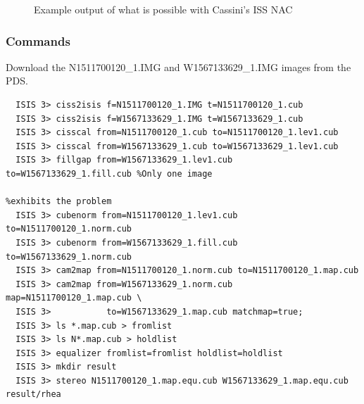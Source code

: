 \begin{figure}[p]
  \hfil
\caption{Example output of what is possible with Cassini's ISS NAC}
\label{fig:cassini-exampe}
\end{figure}

\subsubsection*{Commands}

Download the N1511700120\_1.IMG and W1567133629\_1.IMG images from the \ac{PDS}.
\begin{verbatim}
  ISIS 3> ciss2isis f=N1511700120_1.IMG t=N1511700120_1.cub
  ISIS 3> ciss2isis f=W1567133629_1.IMG t=W1567133629_1.cub
  ISIS 3> cisscal from=N1511700120_1.cub to=N1511700120_1.lev1.cub
  ISIS 3> cisscal from=W1567133629_1.cub to=W1567133629_1.lev1.cub
  ISIS 3> fillgap from=W1567133629_1.lev1.cub to=W1567133629_1.fill.cub %Only one image
                                                                        %exhibits the problem
  ISIS 3> cubenorm from=N1511700120_1.lev1.cub to=N1511700120_1.norm.cub
  ISIS 3> cubenorm from=W1567133629_1.fill.cub to=W1567133629_1.norm.cub
  ISIS 3> cam2map from=N1511700120_1.norm.cub to=N1511700120_1.map.cub
  ISIS 3> cam2map from=W1567133629_1.norm.cub map=N1511700120_1.map.cub \
  ISIS 3>           to=W1567133629_1.map.cub matchmap=true;
  ISIS 3> ls *.map.cub > fromlist
  ISIS 3> ls N*.map.cub > holdlist
  ISIS 3> equalizer fromlist=fromlist holdlist=holdlist
  ISIS 3> mkdir result
  ISIS 3> stereo N1511700120_1.map.equ.cub W1567133629_1.map.equ.cub result/rhea
\end{verbatim}

